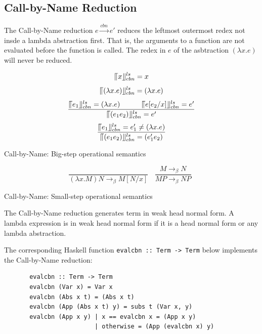 \documentclass[a4paper,11pt,twoside]{report}
\begin{document}
\subsection{Call-by-Name Reduction}{\label{subsec:cbn}}

The Call-by-Name reduction $e\xrightarrow{cbn} e'$ reduces the leftmost outermost redex not insde a lambda abstraction first. That is, the arguments to a function are not evaluated before the function is called. The redex in $e$ of the asbtraction $(\lambda x.e)$ will never be reduced. 


\begin{equation*}
\llceil x \rrfloor ^{ls} _{cbn} = x
\end{equation*}
\begin{equation*}
\llceil (\lambda x.e) \rrfloor ^{ls} _{cbn} = (\lambda x.e)
\end{equation*}
\begin{equation*}
\frac{\llceil e_1 \rrfloor ^{ls} _{cbn} = (\lambda x.e)\ \ \ \ \ \ \ \ \ \llceil e[e_2/x] \rrfloor ^{ls} _{cbn} = e'}{\llceil (e_1e_2) \rrfloor ^{ls} _{cbn} = e'}
\end{equation*}
\begin{equation*}
\frac{\llceil e_1 \rrfloor ^{ls} _{cbn} = e'_1\neq (\lambda x.e)}{\llceil (e_1e_2) \rrfloor ^{ls} _{cbn} = (e'_1e_2)}
\end{equation*}
\begin{center}
Call-by-Name: Big-step operational semantics
\end{center}

\begin{equation*}
\frac{}{(\lambda x.M)N \rightarrow _\beta M[N/x]}\ \ \ \  
\frac{M \rightarrow _\beta N}{MP \rightarrow _\beta NP}\ \ 
\end{equation*}
\begin{center}
Call-by-Name: Small-step operational semantics
\end{center}

The Call-by-Name reduction generates term in weak head normal form. A lambda expression is in weak head normal form if it is a head normal form or any lambda abstraction. 


The corresponding Haskell function \verb|evalcbn :: Term -> Term| below implements the Call-by-Name reduction:

\begin{verbatim}
       evalcbn :: Term -> Term
       evalcbn (Var x) = Var x
       evalcbn (Abs x t) = (Abs x t)
       evalcbn (App (Abs x t) y) = subs t (Var x, y)
       evalcbn (App x y) | x == evalcbn x = (App x y)
	                     | otherwise = (App (evalcbn x) y) 
\end{verbatim}
\end{document}
